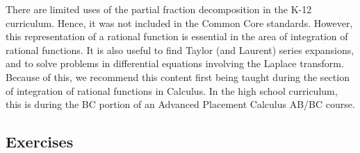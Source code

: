 \documentclass[
]{book}
\theoremstyle{definition}
\theoremstyle{definition}
\theoremstyle{definition}
\theoremstyle{definition}
\theoremstyle{remark}
\begin{document}
There are limited uses of the partial fraction decomposition in the K-12 curriculum. Hence, it was not included in the Common Core standards. However, this representation of a rational function is essential in the area of integration of rational functions. It is also useful to find Taylor (and Laurent) series expansions, and to solve problems in differential equations involving the Laplace transform. Because of this, we recommend this content first being taught during the section of integration of rational functions in Calculus. In the high school curriculum, this is during the BC portion of an Advanced Placement Calculus AB/BC course.

\hypertarget{exercises-33}{%
\subsection{Exercises}\label{exercises-33}}
\end{document}
